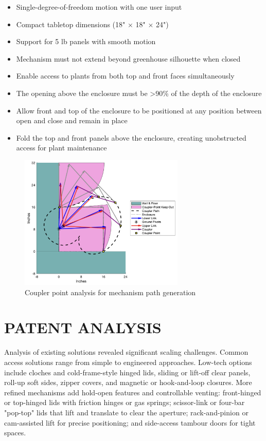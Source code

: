 \documentclass[12pt]{article}
\begin{document}
\begin{itemize}
    \item Single-degree-of-freedom motion with one user input
    \item Compact tabletop dimensions (18" × 18" × 24")
    \item Support for 5 lb panels with smooth motion
    \item Mechanism must not extend beyond greenhouse silhouette when closed
    \item Enable access to plants from both top and front faces simultaneously
    \item The opening above the enclosure must be >90\% of the depth of the enclosure
    \item Allow front and top of the enclosure to be positioned at any position between open and close and remain in place
    \item Fold the top and front panels above the enclosure, creating unobstructed access for plant maintenance
\end{itemize}

\begin{figure}[H]
    \centering
    \includegraphics[width=0.7\textwidth]{../03_Images/Coupler Points.png}
    \caption{Coupler point analysis for mechanism path generation}
    \label{fig:coupler_points}
\end{figure}

\section*{PATENT ANALYSIS}

Analysis of existing solutions revealed significant scaling challenges. Common access solutions range from simple to engineered approaches. Low-tech options include cloches and cold-frame-style hinged lids, sliding or lift-off clear panels, roll-up soft sides, zipper covers, and magnetic or hook-and-loop closures. More refined mechanisms add hold-open features and controllable venting: front-hinged or top-hinged lids with friction hinges or gas springs; scissor-link or four-bar "pop-top" lids that lift and translate to clear the aperture; rack-and-pinion or cam-assisted lift for precise positioning; and side-access tambour doors for tight spaces.
\end{document}
